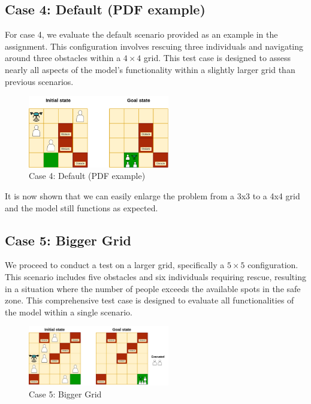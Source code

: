 \documentclass{article}
\begin{document}
\subsection{Case 4: Default (PDF example)}

For case 4, we evaluate the default scenario provided as an example in the assignment. This configuration involves rescuing three individuals and navigating around three obstacles within a \(4 \times 4\) grid. This test case is designed to assess nearly all aspects of the model's functionality within a slightly larger grid than previous scenarios.

\begin{figure}[ht]
    \centering
    \includegraphics[width=0.55\textwidth]{assets/problem-4-pdf-example.drawio.png}
    \caption{Case 4: Default (PDF example)}
    \label{fig:initial-state-default}
\end{figure}
\FloatBarrier

It is now shown that we can easily enlarge the problem from a 3x3 to a 4x4 grid and the model still functions as expected.

\subsection{Case 5: Bigger Grid}

We proceed to conduct a test on a larger grid, specifically a \(5 \times 5\) configuration. This scenario includes five obstacles and six individuals requiring rescue, resulting in a situation where the number of people exceeds the available spots in the safe zone. This comprehensive test case is designed to evaluate all functionalities of the model within a single scenario.

\begin{figure}[ht]
    \centering
    \includegraphics[width=0.55\textwidth]{assets/problem-5-big.drawio.png}
    \caption{Case 5: Bigger Grid}
    \label{fig:initial-state-bigger-grid}
\end{figure}
\FloatBarrier
\end{document}
